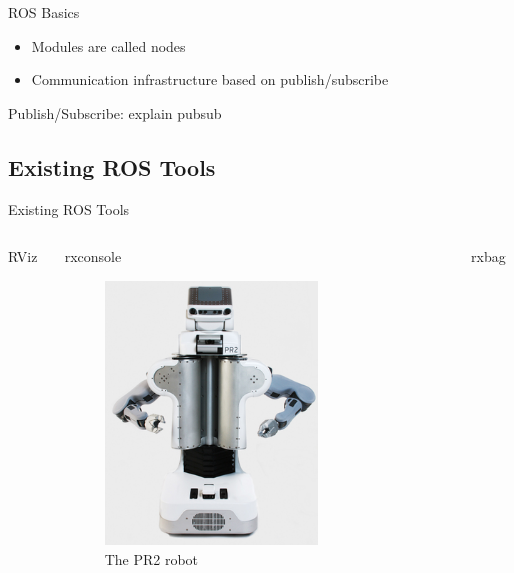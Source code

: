 \documentclass[compress]{beamer}
\begin{document}
\begin{frame}{ROS Basics}
\begin{itemize}
\item Modules are called nodes
\item Communication infrastructure based on publish/subscribe
\end{itemize}
\pause
\begin{block}{Publish/Subscribe:}
explain pubsub
\end{block}
\end{frame}

\subsection{Existing ROS Tools}
\begin{frame}{Existing ROS Tools}

\begin{columns}
\begin{column}{.3\textwidth}
RViz
\end{column}%
\hfill%
\begin{column}{.3\textwidth}
rxconsole
\begin{figure}[t]
    \centering
    \includegraphics[width=0.7\textwidth]{images/pr2.png}
    \caption[The PR2 robot]{The PR2 robot}
\end{figure}
\end{column}%
\hfill%
\begin{column}{.3\textwidth}
rxbag
\end{column}
\end{columns}
\end{frame}
\end{document}
